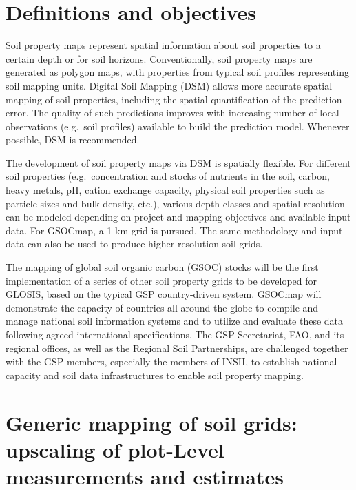 \documentclass[10pt,b5paper,]{book}
\theoremstyle{definition}
\theoremstyle{definition}
\theoremstyle{definition}
\theoremstyle{remark}
\begin{document}
\hypertarget{definitions-and-objectives}{%
\section{Definitions and objectives}\label{definitions-and-objectives}}

 Soil property maps represent spatial
information about soil properties to a certain depth or for soil
horizons. Conventionally, soil property maps are
generated as polygon maps, with properties from typical soil profiles
representing soil mapping units. Digital Soil Mapping
(DSM) allows more accurate spatial
mapping of soil properties, including the spatial quantification of the
prediction error. The quality of such
predictions improves with increasing number of local observations
(e.g.~soil profiles) available to build the prediction
model. Whenever possible, DSM is recommended.

The development of soil property maps via DSM is spatially flexible. For
different soil properties (e.g.~concentration and stocks of nutrients in
the soil, carbon, heavy metals, pH, cation exchange capacity, physical
soil properties such as particle sizes and bulk density, etc.), various
depth classes and spatial resolution can be modeled depending on project
and mapping objectives and available input data. For
GSOCmap, a 1 km grid is
pursued. The same methodology and input data can also be used to produce
higher resolution soil grids.

The mapping of global soil organic carbon (GSOC) stocks will be the
first implementation of a series of other soil property grids to be
developed for GLOSIS, based
on the typical GSP country-driven system. GSOCmap will demonstrate the
capacity of countries all around the globe to compile and manage
national soil information systems and to utilize and evaluate these data
following agreed international specifications. The GSP Secretariat, FAO,
and its regional offices, as well as the Regional Soil Partnerships, are
challenged together with the GSP members, especially the members of
INSII, to establish national capacity and soil data infrastructures to
enable soil property mapping. 

\hypertarget{generic-mapping-of-soil-grids-upscaling-of-plot-level-measurements-and-estimates}{%
\section{Generic mapping of soil grids: upscaling of plot-Level
measurements and
estimates}\label{generic-mapping-of-soil-grids-upscaling-of-plot-level-measurements-and-estimates}}
\end{document}
